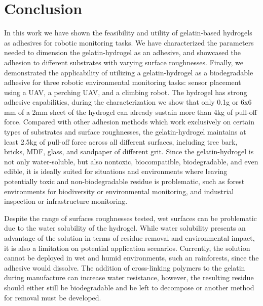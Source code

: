 \section{Conclusion}
In this work we have shown the feasibility and utility of gelatin-based hydrogels as adhesives for robotic monitoring tasks.
We have characterized the parameters needed to dimension the gelatin-hydrogel as an adhesive, and showcased the adhesion to different substrates with varying surface roughnesses. Finally, we demonstrated the applicability of utilizing a gelatin-hydrogel as a biodegradable adhesive for three robotic environmental monitoring tasks: sensor placement using a UAV, a perching UAV, and a climbing robot. The hydrogel has strong adhesive capabilities, during the characterization we show that only 0.1g or 6x6 mm of a 2mm sheet of the hydrogel can already sustain more than 4kg of pull-off force. Compared with other adhesion methods which work exclusively on certain types of substrates and surface roughnesses, the gelatin-hydrogel maintains at least 2.5kg of pull-off force across all different surfaces, including tree bark, bricks, MDF, glass, and sandpaper of different grit. Since the gelatin-hydrogel is not only water-soluble, but also nontoxic, biocompatible, biodegradable, and even edible, it is ideally suited for situations and environments where leaving potentially toxic and non-biodegradable residue is problematic, such as forest environments for biodiversity or environmental monitoring, and  industrial inspection or infrastructure monitoring. 

Despite the range of surfaces roughnesses tested, wet surfaces can be problematic due to the water solubility of the hydrogel. While water solubility presents an advantage of the solution in terms of residue removal and environmental impact, it is also a limitation on potential application scenarios. Currently, the solution cannot be deployed in wet and humid environments, such an rainforests, since the adhesive would dissolve. The addition of cross-linking polymers to the gelatin \cite{Stoessel2015, Gomez-Estaca2011, Wang2020} during manufacture can increase water resistance, however, the resulting residue should either still be biodegradable and be left to decompose or another method for removal must be developed.

